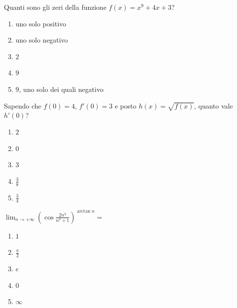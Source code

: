\begin{quiz}
Quanti sono gli zeri della funzione $f(x)=x^9+4x+3$?
\begin{enumerate}[label=\alph*),leftmargin=1.3cm,itemsep=3pt,topsep=5pt]\item uno solo positivo\item uno solo negativo\item $2$\item $9$\item $9$, uno solo dei quali negativo\end{enumerate}
\end{quiz}

\begin{quiz}
Sapendo che $f(0)=4$, $f'(0)=3$ e posto $h(x)=\sqrt{f(x)}$, quanto vale $h'(0)$?
\begin{enumerate}[label=\alph*),leftmargin=1.3cm,itemsep=3pt,topsep=5pt]\item $2$\item $0$\item $3$\item $\frac38$\item $\frac34$\end{enumerate}
\end{quiz}

\begin{quiz}
$\displaystyle\lim_{n\to+\infty}\left(\cos\frac{2n^2}{n^3+1}\right)^{\arctan n}=$
\begin{enumerate}[label=\alph*),leftmargin=1.3cm,itemsep=3pt,topsep=5pt]\item $1$\item $\frac\pi2$\item $e$\item $0$\item $\infty$\end{enumerate}
\end{quiz}

